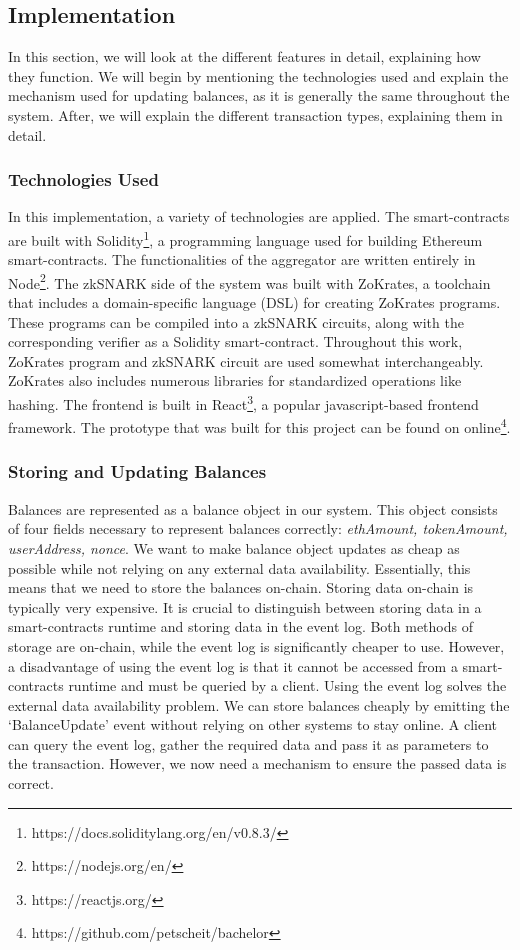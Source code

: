 \documentclass[../../thesis.tex]{subfiles}
\begin{document}
\subsection{Implementation}
In this section, we will look at the different features in detail, explaining how they function. We will begin by mentioning the technologies used and explain the  mechanism used for updating balances, as it is generally the same throughout the system. After, we will explain the different transaction types, explaining them in detail.

\subsubsection{Technologies Used}
In this implementation, a variety of technologies are applied. The smart-contracts are built with Solidity\footnote{https://docs.soliditylang.org/en/v0.8.3/}, a programming language used for building Ethereum smart-contracts. The functionalities of the aggregator are written entirely in Node\footnote{https://nodejs.org/en/}. The zkSNARK side of the system was built with ZoKrates, a toolchain that includes a domain-specific language (DSL) for creating ZoKrates programs. These programs can be compiled into a zkSNARK circuits, along with the corresponding verifier as a Solidity smart-contract. Throughout this work, ZoKrates program and zkSNARK circuit are used somewhat interchangeably. ZoKrates also includes numerous libraries for standardized operations like hashing. The frontend is built in React\footnote{https://reactjs.org/}, a popular javascript-based frontend framework. The prototype that was built for this project can be found on online\footnote{https://github.com/petscheit/bachelor}.

\subsubsection{Storing and Updating Balances} \label{balances}
Balances are represented as a balance object in our system. This object consists of four fields necessary to represent balances correctly: \textit{ethAmount, tokenAmount, userAddress, nonce}. We want to make balance object updates as cheap as possible while not relying on any external data availability. Essentially, this means that we need to store the balances on-chain. Storing data on-chain is typically very expensive. It is crucial to distinguish between storing data in a smart-contracts runtime and storing data in the event log. Both methods of storage are on-chain, while the event log is significantly cheaper to use. However, a disadvantage of using the event log is that it cannot be accessed from a smart-contracts runtime and must be queried by a client. Using the event log solves the external data availability problem. We can store balances cheaply by emitting the `BalanceUpdate' event without relying on other systems to stay online. A client can query the event log, gather the required data and pass it as parameters to the transaction. However, we now need a mechanism to ensure the passed data is correct.
\end{document}
